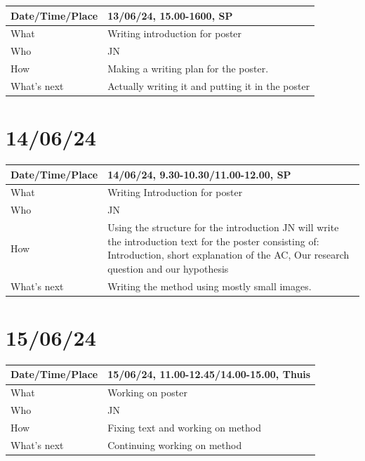 \documentclass{article}
\begin{document}
\begin{table}[H]
\begin{tabular}{|p{1.5in}|p{4in}|}
\hline
Date/Time/Place & 13/06/24, 15.00-1600, SP \\ \hline
What            & Writing introduction for poster \\ \hline
Who             & JN \\ \hline
How             & Making a writing plan for the poster. \\ \hline
What's next     & Actually writing it and putting it in the poster \\ \hline
\end{tabular}
\end{table}


\section{14/06/24}


\begin{table}[H]
\begin{tabular}{|p{1.5in}|p{4in}|}
\hline
Date/Time/Place & 14/06/24, 9.30-10.30/11.00-12.00, SP \\ \hline
What            & Writing Introduction for poster \\ \hline
Who             & JN \\ \hline
How             & Using the structure for the introduction JN will write the introduction text for the poster consisting of: Introduction, short explanation of the AC, Our research question and our hypothesis \\ \hline
What's next     & Writing the method using mostly small images. \\ \hline
\end{tabular}
\end{table}

\section{15/06/24}

\begin{table}[H]
\begin{tabular}{|p{1.5in}|p{4in}|}
\hline
Date/Time/Place & 15/06/24, 11.00-12.45/14.00-15.00, Thuis \\ \hline
What            & Working on poster \\ \hline
Who             & JN \\ \hline
How             & Fixing text and working on method \\ \hline
What's next     & Continuing working on method \\ \hline
\end{tabular}
\end{table}
\end{document}
